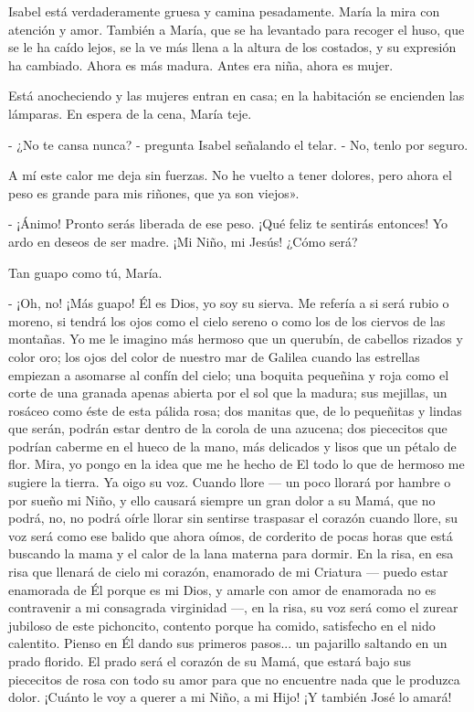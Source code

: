 \documentclass[12pt]{book} %
\begin{document}
Isabel está verdaderamente gruesa y camina pesadamente. María la mira con atención y amor. También a María, que se ha levantado para recoger el huso, que se le ha caído lejos, se la ve más llena a la altura de los costados, y su expresión ha cambiado. Ahora es más madura. Antes era niña, ahora es mujer. 

Está anocheciendo y las mujeres entran en casa; en la habitación se encienden las lámparas. En espera de la cena, María teje. 

- ¿No te cansa nunca? - pregunta Isabel señalando el telar. - No, tenlo por seguro. 

A mí este calor me deja sin fuerzas. No he vuelto a tener dolores, pero ahora el peso es grande para mis riñones, que ya son viejos». 

- ¡Ánimo! Pronto serás liberada de ese peso. ¡Qué feliz te sentirás entonces! Yo ardo en deseos de ser madre. ¡Mi Niño, mi Jesús! ¿Cómo será? 

Tan guapo como tú, María. 

- ¡Oh, no! ¡Más guapo! Él es Dios, yo soy su sierva. Me refería a si será rubio o moreno, si tendrá los ojos como el cielo sereno o como los de los ciervos de las montañas. Yo me le imagino más hermoso que un querubín, de cabellos rizados y color oro; los ojos del color de nuestro mar de Galilea cuando las estrellas empiezan a asomarse al confín del cielo; una boquita pequeñina y roja como el corte de una granada apenas abierta por el sol que la madura; sus mejillas, un rosáceo como éste de esta pálida rosa; dos manitas que, de lo pequeñitas y lindas que serán, podrán estar dentro de la corola de una azucena; dos piececitos que podrían caberme en el hueco de la mano, más delicados y lisos que un pétalo de flor. Mira, yo pongo en la idea que me he hecho de El todo lo que de hermoso me sugiere la tierra. Ya oigo su voz. Cuando llore — un poco llorará por hambre o por sueño mi Niño, y ello causará siempre un gran dolor a su Mamá, que no podrá, no, no podrá oírle llorar sin sentirse traspasar el corazón cuando llore, su voz será como ese balido que ahora oímos, de corderito de pocas horas que está buscando la mama y el calor de la lana materna para dormir. En la risa, en esa risa que llenará de cielo mi corazón, enamorado de mi Criatura — puedo estar enamorada de Él porque es mi Dios, y amarle con amor de enamorada no es contravenir a mi consagrada virginidad —, en la risa, su voz será como el zurear jubiloso de este pichoncito, contento porque ha comido, satisfecho en el nido calentito. Pienso en Él dando sus primeros pasos... un pajarillo saltando en un prado florido. El prado será el corazón de su Mamá, que estará bajo sus piececitos de rosa con todo su amor para que no encuentre nada que le produzca dolor. ¡Cuánto le voy a querer a mi Niño, a mi Hijo! ¡Y también José lo amará! 
\end{document}
